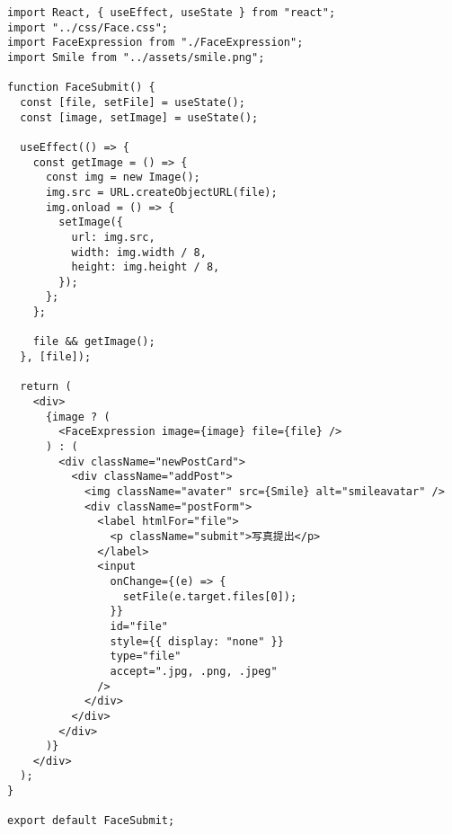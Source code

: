 \begin{verbatim}
import React, { useEffect, useState } from "react";
import "../css/Face.css";
import FaceExpression from "./FaceExpression";
import Smile from "../assets/smile.png";

function FaceSubmit() {
  const [file, setFile] = useState();
  const [image, setImage] = useState();

  useEffect(() => {
    const getImage = () => {
      const img = new Image();
      img.src = URL.createObjectURL(file);
      img.onload = () => {
        setImage({
          url: img.src,
          width: img.width / 8,
          height: img.height / 8,
        });
      };
    };

    file && getImage();
  }, [file]);

  return (
    <div>
      {image ? (
        <FaceExpression image={image} file={file} />
      ) : (
        <div className="newPostCard">
          <div className="addPost">
            <img className="avater" src={Smile} alt="smileavatar" />
            <div className="postForm">
              <label htmlFor="file">
                <p className="submit">写真提出</p>
              </label>
              <input
                onChange={(e) => {
                  setFile(e.target.files[0]);
                }}
                id="file"
                style={{ display: "none" }}
                type="file"
                accept=".jpg, .png, .jpeg"
              />
            </div>
          </div>
        </div>
      )}
    </div>
  );
}

export default FaceSubmit;

\end{verbatim}
